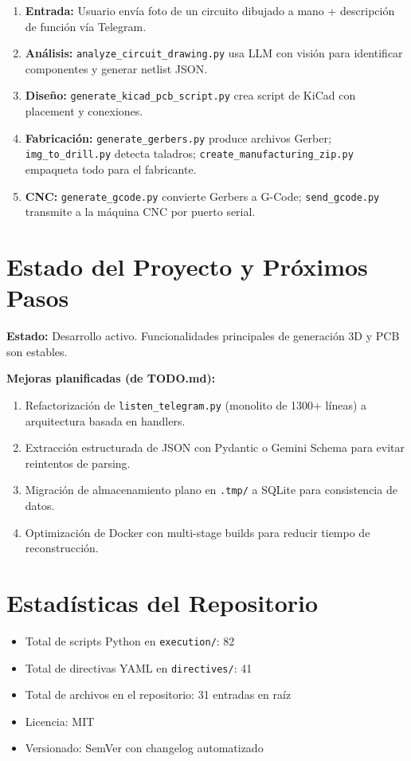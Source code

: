\documentclass[12pt, a4paper]{article}
\begin{document}
\begin{enumerate}[leftmargin=*]
    \item \textbf{Entrada:} Usuario envía foto de un circuito dibujado a mano + descripción de función vía Telegram.
    \item \textbf{Análisis:} \texttt{analyze\_circuit\_drawing.py} usa LLM con visión para identificar componentes y generar netlist JSON.
    \item \textbf{Diseño:} \texttt{generate\_kicad\_pcb\_script.py} crea script de KiCad con placement y conexiones.
    \item \textbf{Fabricación:} \texttt{generate\_gerbers.py} produce archivos Gerber; \texttt{img\_to\_drill.py} detecta taladros; \texttt{create\_manufacturing\_zip.py} empaqueta todo para el fabricante.
    \item \textbf{CNC:} \texttt{generate\_gcode.py} convierte Gerbers a G-Code; \texttt{send\_gcode.py} transmite a la máquina CNC por puerto serial.
\end{enumerate}

\section{Estado del Proyecto y Próximos Pasos}

\textbf{Estado:} Desarrollo activo. Funcionalidades principales de generación 3D y PCB son estables.

\textbf{Mejoras planificadas (de TODO.md):}
\begin{enumerate}[leftmargin=*]
    \item Refactorización de \texttt{listen\_telegram.py} (monolito de 1300+ líneas) a arquitectura basada en handlers.
    \item Extracción estructurada de JSON con Pydantic o Gemini Schema para evitar reintentos de parsing.
    \item Migración de almacenamiento plano en \texttt{.tmp/} a SQLite para consistencia de datos.
    \item Optimización de Docker con multi-stage builds para reducir tiempo de reconstrucción.
\end{enumerate}

\section{Estadísticas del Repositorio}

\begin{itemize}[leftmargin=*]
    \item Total de scripts Python en \texttt{execution/}: 82
    \item Total de directivas YAML en \texttt{directives/}: 41
    \item Total de archivos en el repositorio: 31 entradas en raíz
    \item Licencia: MIT
    \item Versionado: SemVer con changelog automatizado
\end{itemize}
\end{document}
